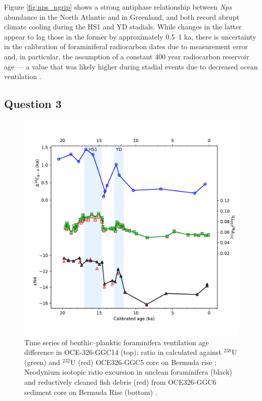 Figure \ref{fig:nps_ngrip} shows a strong antiphase relationship between \emph{Nps} abundance in the North Atlantic and \delO{} in Greenland, and both record abrupt climate cooling during the HS1 and YD stadials.
While changes in the latter appear to lag those in the former by approximately 0.5--1 ka, there is uncertainty in the calibration of foraminiferal \fC{} radiocarbon dates due to measurement error and, in particular, the assumption of a constant 400 year radiocarbon reservoir age --- a value that was likely higher during stadial events due to decreased ocean ventilation \parencite{bard1994north, hughen2004marine04}.

            
\subsection{Question 3}
\label{sec:Q2.3}
\begin{figure}[p]
\includegraphics[width=\textwidth]{img/timeseries_B-P_PaTh_eNd}
    \caption{Time series of benthic--planktic foraminifera \fC{} ventilation age difference in OCE-326-GGC14 (top);
             \PaTh{} ratio in calculated against $^{238}$U (green) and $^{232}$U (red) OCE326-GGC5 core on Bermuda rise \parencite[data from][]{mcmanus2004collapse};
             Neodynium isotopic ratio excursion in unclean foraminifera (black) and reductively cleaned fish debris (red) from OCE326-GGC6 sediment core on Bermuda Rise (bottom) \parencite[data from][]{roberts2010synchronous}.}
            \label{fig:bp_path_end}
\end{figure}
